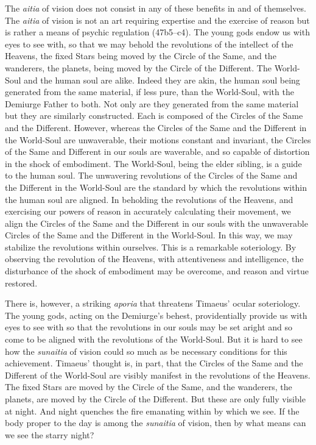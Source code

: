 The \emph{aitia} of vision does not consist in any of these benefits in and of themselves. The \emph{aitia} of vision is not an art requiring expertise and the exercise of reason but is rather a means of psychic regulation (47b5--c4). The young gods endow us with eyes to see with, so that we may behold the revolutions of the intellect of the Heavens, the fixed Stars being moved by the Circle of the Same, and the wanderers, the planets, being moved by the Circle of the Different. The World-Soul and the human soul are alike. Indeed they are akin, the human soul being generated from the same material, if less pure, than the World-Soul, with the Demiurge Father to both. Not only are they generated from the same material but they are similarly constructed. Each is composed of the Circles of the Same and the Different. However, whereas the Circles of the Same and the Different in the World-Soul are unwaverable, their motions constant and invariant, the Circles of the Same and Different in our souls are waverable, and so capable of distortion in the shock of embodiment. The World-Soul, being the elder sibling, is a guide to the human soul. The unwavering revolutions of the Circles of the Same and the Different in the World-Soul are the standard by which the revolutions within the human soul are aligned. In beholding the revolutions of the Heavens, and exercising our powers of reason in accurately calculating their movement, we align the Circles of the Same and the Different in our souls with the unwaverable Circles of the Same and the Different in the World-Soul. In this way, we may stabilize the revolutions within ourselves. This is a remarkable soteriology. By observing the revolution of the Heavens, with attentiveness and intelligence, the disturbance of the shock of embodiment may be overcome, and reason and virtue restored.

There is, however, a striking \emph{aporia} that threatens Timaeus' ocular soteriology. The young gods, acting on the Demiurge's behest, providentially provide us with eyes to see with so that the revolutions in our souls may be set aright and so come to be aligned with the revolutions of the World-Soul. But it is hard to see how the \emph{sunaitia} of vision could so much as be necessary conditions for this achievement. Timaeus' thought is, in part, that the Circles of the Same and the Different of the World-Soul are visibly manifest in the revolutions of the Heavens. The fixed Stars are moved by the Circle of the Same, and the wanderers, the planets, are moved by the Circle of the Different. But these are only fully visible at night. And night quenches the fire emanating within by which we see. If the body proper to the day is among the \emph{sunaitia} of vision, then by what means can we see the starry night?

